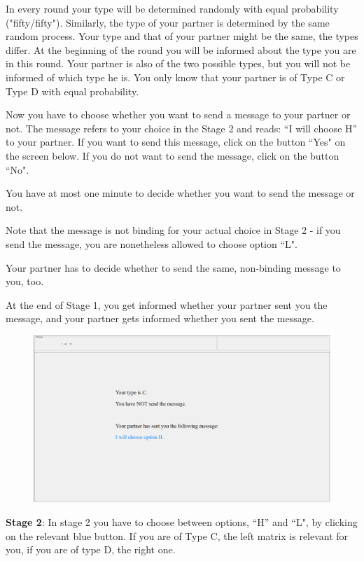 \documentclass[12pt]{article}
\theoremstyle{break}
\begin{document}
In every round your type will be determined randomly with equal probability ("fifty/fifty"). Similarly, the type of your partner is determined by the same random process. Your type and that of your partner might be the same, the types differ.
At the beginning of the round you will be informed about the type you are in this round. Your partner is also of the two possible types, but you will not be informed of which type he is. You only know that your partner is of Type C or Type D with equal probability.

Now you have to choose whether you want to send a message to your partner or not. The message refers to your choice in the Stage 2 and reads: “I will choose H” to your partner. If you want to send this message, click on the button ``Yes" on the screen below. If you do not want to send the message, click on the button ``No". 

You have at most one minute to decide whether you want to send the message or not. 

Note that the message is not binding for your actual choice in Stage 2 - if you send the message, you are nonetheless allowed to choose option ``L".

Your partner has to decide whether to send the same, non-binding message to you, too.

At the end of Stage 1, you get informed whether your partner sent you the message, and your partner gets informed whether you sent the message. 

\begin{figure}[h]
  \centering
    \includegraphics[width=.9\textwidth]{fig2-CT-instructions.png}
  \label{fig:fig2-CT-instructions}
\end{figure}


\textbf{Stage 2}: In stage 2 you have to choose between options, ``H'' and ``L", by clicking on the relevant blue button. 
If you are of Type C, the left matrix is relevant for you, if you are of type D, the right one.
\end{document}
